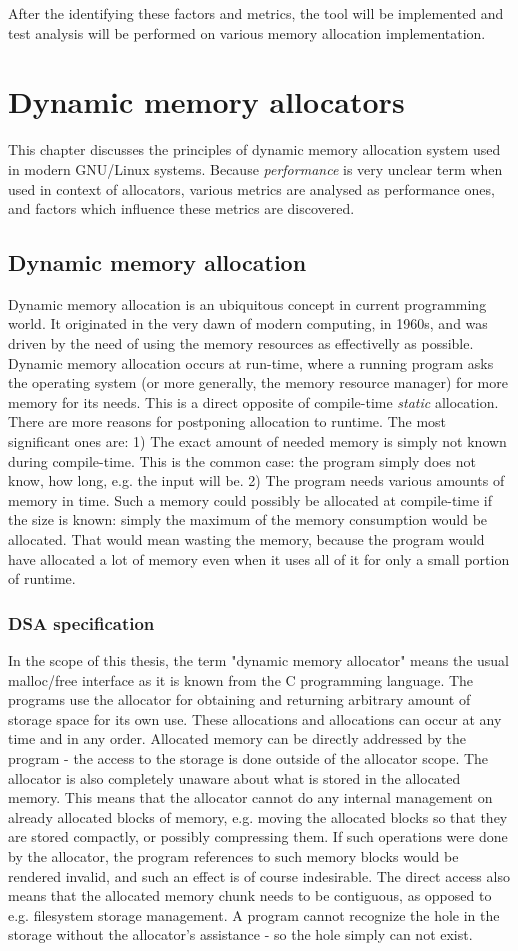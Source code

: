 After the identifying these factors and metrics, the tool will be implemented and test analysis will be performed on various memory allocation implementation.
\chapter{Dynamic memory allocators}
This chapter discusses the principles of dynamic memory allocation system used in modern GNU/Linux systems. Because {\em performance} is very unclear term when used in context of allocators, various metrics are analysed as performance ones, and factors which influence these metrics are discovered.
\section{Dynamic memory allocation}
Dynamic memory allocation is an ubiquitous concept in current programming world. It originated in the very dawn of modern computing, in 1960s, and was driven by the need of using the memory resources as effectivelly as possible. Dynamic memory allocation occurs at run-time, where a running program asks the operating system (or more generally, the memory resource manager) for more memory for its needs. This is a direct opposite of compile-time {\em static} allocation. There are more reasons for postponing allocation to runtime. The most significant ones are: 1) The exact amount of needed memory is simply not known during compile-time. This is the common case: the program simply does not know, how long, e.g. the input will be. 2) The program needs various amounts of memory in time. Such a memory could possibly be allocated at compile-time if the size is known: simply the maximum of the memory consumption would be allocated. That would mean wasting the memory, because the program would have allocated a lot of memory even when it uses all of it for only a small portion of runtime.
\subsection{DSA specification}
In the scope of this thesis, the term "dynamic memory allocator" means the usual malloc/free interface as it is known from the C programming language. The programs use the allocator for obtaining and returning arbitrary amount of storage space for its own use. These allocations and allocations can occur at any time and in any order. Allocated memory can be directly addressed by the program - the access to the storage is done outside of the allocator scope. The allocator is also completely unaware about what is stored in the allocated memory. This means that the allocator cannot do any internal management on already allocated blocks of memory, e.g. moving the allocated blocks so that they are stored compactly, or possibly compressing them. If such operations were done by the allocator, the program references to such memory blocks would be rendered invalid, and such an effect is of course indesirable. The direct access also means that the allocated memory chunk needs to be contiguous, as opposed to e.g. filesystem storage management. A program cannot recognize the hole in the storage without the allocator's assistance - so the hole simply can not exist.

